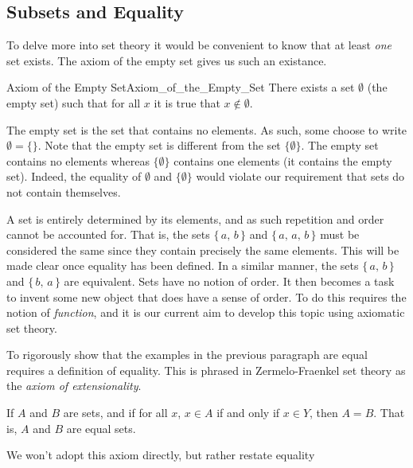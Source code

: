     \subsection{Subsets and Equality}
        To delve more into set theory it would be convenient to know that
        at least \textit{one} set exists. The axiom of the empty set gives
        us such an existance.
        \begin{faxiom}{Axiom of the Empty Set}{Axiom_of_the_Empty_Set}
            There exists a set $\emptyset$ (the \gls{empty set}) such
            that for all $x$ it is true that $x\notin\emptyset$.
        \end{faxiom}
        The empty set is the set that contains no elements. As such, some
        choose to write $\emptyset=\{\}$. Note that the empty set is
        different from the set $\{\emptyset\}$. The empty set contains no
        elements whereas $\{\emptyset\}$ contains one elements (it
        contains the empty set). Indeed, the equality of $\emptyset$ and
        $\{\emptyset\}$ would violate our requirement that sets do not
        contain themselves.
        \par\hfill\par
        A set is entirely determined by its elements, and as such
        repetition and order cannot be accounted for. That is, the sets
        $\{\,a,\,b\,\}$ and $\{\,a,\,a,\,b\,\}$ must be considered the same
        since they contain precisely the same elements. This will be made clear
        once equality has been defined. In a similar manner, the sets
        $\{\,a,\,b\,\}$ and $\{\,b,\,a\,\}$ are equivalent. Sets have no notion
        of order. It then becomes a task to invent some new object that does
        have a sense of order. To do this requires the notion of
        \textit{function}, and it is our current aim to develop this topic
        using axiomatic set theory.
        \par\hfill\par
        To rigorously show that the examples in the previous paragraph are
        equal requires a definition of equality. This is phrased in
        Zermelo-Fraenkel set theory as the \textit{axiom of extensionality}.
        \begin{axiom}
            If $A$ and $B$ are sets, and if for all $x$, $x\in{A}$
            if and only if $x\in{Y}$, then $A=B$. That is,
            $A$ and $B$ are equal sets.
        \end{axiom}
        We won't adopt this axiom directly, but rather restate equality
